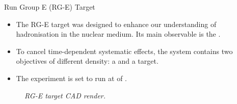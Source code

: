 \begin{frame}{Run Group E (RG-E) Target}
    \label{10.21::rge_target}

    \begin{itemize}
        \item
            The RG-E target was designed to enhance our understanding of hadronisation in the nuclear medium.
            Its main observable is the .

        \item
            To cancel time-dependent systematic effects, the system contains two objectives of different density: a  and a  target.

        \item
            The experiment is set to run at  of .
    \end{itemize}

    \begin{center}
        \begin{figure}[t]

            \scriptsize{\textit{
                RG-E target CAD render.
            }}
        \end{figure}
    \end{center}
\end{frame}
